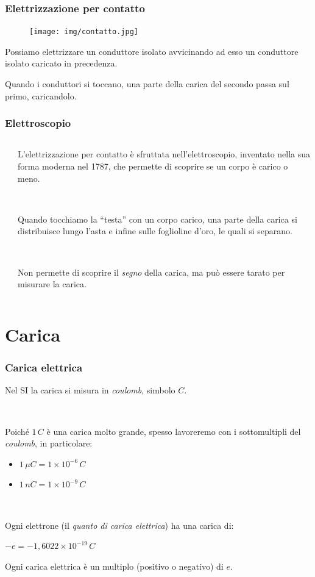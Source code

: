 \documentclass[]{beamer}
\theoremstyle{plain}
\begin{document}
\begin{frame}
\frametitle{Elettrizzazione per contatto}
\begin{figure}
\texttt{[image: img/contatto.jpg]}
\end{figure}
Possiamo elettrizzare un conduttore isolato avvicinando ad esso un conduttore isolato caricato in precedenza.

Quando i conduttori si toccano, \alert{una parte della carica del secondo passa sul primo, caricandolo}.
\end{frame}





\begin{frame}
\frametitle{Elettroscopio}
\begin{columns}
\begin{column}{0.2\textwidth}
\end{column}
\begin{column}{0.7\textwidth}
L'elettrizzazione per contatto è sfruttata nell'elettroscopio, inventato nella sua forma moderna nel 1787, che permette di scoprire se un corpo è carico o meno.\pause

~

Quando tocchiamo la ``testa'' con un corpo carico, una parte della carica si distribuisce lungo l'asta e infine sulle foglioline d'oro, le quali \alert{si separano}.\pause

~

Non permette di scoprire il \emph{segno} della carica, ma può essere tarato per misurare la carica.
\end{column}
\end{columns}
\end{frame}



\section{Carica}

\begin{frame}
\frametitle{Carica elettrica}
Nel SI \alert<1>{la carica si misura in \emph{coulomb}}, simbolo $ C $.\pause

~

Poiché $ 1 \, C $ è una carica molto grande, spesso lavoreremo con i sottomultipli del \emph{coulomb}, in particolare:
\begin{itemize}
  \item $ 1 \, \mu C = 1 \times 10^{-6} \, C $
  \item $ 1 \, n C = 1 \times 10^{-9} \, C $
\end{itemize}\pause

~

Ogni elettrone (il \emph{quanto di carica elettrica}) ha una carica di:
\begin{center}
\colorbox{blue!30}{$ -e = - 1,6022 \times 10^{-19} \, C $}
\end{center}

Ogni carica elettrica è un multiplo (positivo o negativo) di $ e $.
\end{frame}
\end{document}
